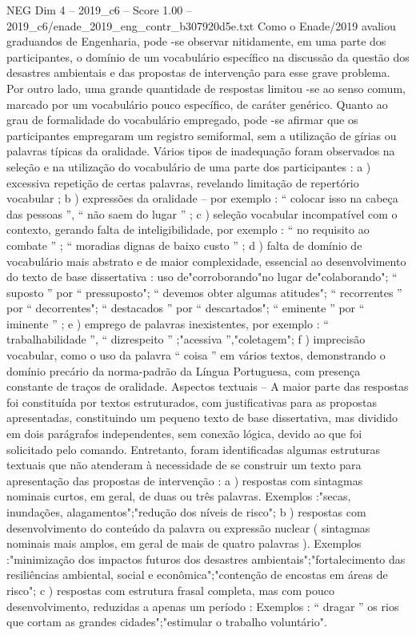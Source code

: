 \begin{textsample}{NEG Dim 4 – 2019\_c6 – Score 1.00 – 2019\_c6/enade\_2019\_eng\_contr\_b307920d5e.txt}
Como o Enade/2019 avaliou graduandos de Engenharia, pode -se observar nitidamente, em uma parte dos participantes, o domínio de um vocabulário específico na discussão da questão dos desastres ambientais e das propostas de intervenção para esse grave problema.
Por outro lado, uma grande quantidade de respostas limitou -se ao senso comum, marcado por um vocabulário pouco específico, de caráter genérico.
Quanto ao grau de formalidade do vocabulário empregado, pode -se afirmar que os participantes empregaram um registro semiformal, sem a utilização de gírias ou palavras típicas da oralidade.
Vários tipos de inadequação foram observados na seleção e na utilização do vocabulário de uma parte dos participantes : a ) excessiva repetição de certas palavras, revelando limitação de repertório vocabular ; b ) expressões da oralidade – por exemplo : “ colocar isso na cabeça das pessoas ”, “ não saem do lugar ” ; c ) seleção vocabular incompatível com o contexto, gerando falta de inteligibilidade, por exemplo : “ no requisito ao combate ” ; “ moradias dignas de baixo custo ” ; d ) falta de domínio de vocabulário mais abstrato e de maior complexidade, essencial ao desenvolvimento do texto de base dissertativa : uso de"corroborando"no lugar de"colaborando"; “ suposto ” por “ pressuposto"; “ devemos obter algumas atitudes"; “ recorrentes ” por “ decorrentes"; “ destacados ” por “ descartados"; “ eminente ” por “ iminente ” ; e ) emprego de palavras inexistentes, por exemplo : “ trabalhabilidade ”, “ dizrespeito ” ;"acessiva ”,"coletagem"; f ) imprecisão vocabular, como o uso da palavra “ coisa ” em vários textos, demonstrando o domínio precário da norma-padrão da Língua Portuguesa, com presença constante de traços de oralidade.
Aspectos textuais – A maior parte das respostas foi constituída por textos estruturados, com justificativas para as propostas apresentadas, constituindo um pequeno texto de base dissertativa, mas dividido em dois parágrafos independentes, sem conexão lógica, devido ao que foi solicitado pelo comando.
Entretanto, foram identificadas algumas estruturas textuais que não atenderam à necessidade de se construir um texto para apresentação das propostas de intervenção : a ) respostas com sintagmas nominais curtos, em geral, de duas ou três palavras.
Exemplos :"secas, inundações, alagamentos";"redução dos níveis de risco"; b ) respostas com desenvolvimento do conteúdo da palavra ou expressão nuclear ( sintagmas nominais mais amplos, em geral de mais de quatro palavras ).
Exemplos :"minimização dos impactos futuros dos desastres ambientais";"fortalecimento das resiliências ambiental, social e econômica";"contenção de encostas em áreas de risco"; c ) respostas com estrutura frasal completa, mas com pouco desenvolvimento, reduzidas a apenas um período : Exemplos : “ dragar ” os rios que cortam as grandes cidades";"estimular o trabalho voluntário".

\end{textsample}
